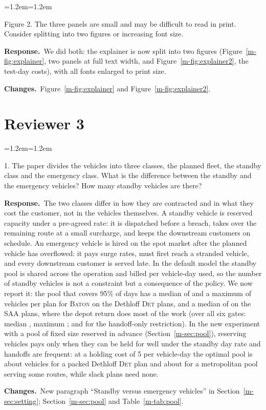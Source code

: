 \documentclass[11pt]{article}
\newenvironment{comment}{\par\medskip\noindent\color{rev}\itshape
  \begin{list}{}{\leftmargin=1.2em\rightmargin=1.2em}\item[]}%
  {\end{list}\par}
\newcommand{\resp}{\par\noindent\textbf{Response.}\ }
\newcommand{\chg}{\par\noindent\textbf{Changes.}\ }
\newcommand{\sref}[1]{Section~\ref{m-#1}}
\newcommand{\tref}[1]{Table~\ref{m-#1}}
\newcommand{\fref}[1]{Figure~\ref{m-#1}}
\newcommand{\BATON}{\textsc{Baton}}
\begin{document}
\begin{comment}
Figure 2. The three panels are small and may be difficult to read in
print. Consider splitting into two figures or increasing font size.
\end{comment}
\resp We did both: the explainer is now split into two figures
(\fref{fig:explainer}, two panels at full text width, and
\fref{fig:explainer2}, the test-day costs), with all fonts enlarged to
print size.
\chg \fref{fig:explainer} and \fref{fig:explainer2}.

\section*{Reviewer 3}

\begin{comment}
1. The paper divides the vehicles into three classes, the planned
fleet, the standby class and the emergency class. What is the
difference between the standby and the emergency vehicles? How many
standby vehicles are there?
\end{comment}
\resp The two classes differ in how they are contracted and in what
they cost the customer, not in the vehicles themselves. A standby
vehicle is reserved capacity under a pre-agreed rate: it is dispatched
before a breach, takes over the remaining route at a small surcharge,
and keeps the downstream customers on schedule. An emergency vehicle is
hired on the spot market after the planned vehicle has overflowed: it
pays surge rates, must first reach a stranded vehicle, and every
downstream customer is served late. In the default model the standby
pool is shared across the operation and billed per vehicle-day used, so
the number of standby vehicles is not a constraint but a consequence
of the policy. We now report it: the pool that covers 95\% of days has
a median of \poolDetMed{} and a maximum of \poolDetMax{} vehicles per
plan for \BATON{} on the Dethloff \textsc{Det} plans, and a median of
\poolSAAMed{} on the \textsc{SAA} plans, where the depot return does
most of the work (over all six gates: median \poolBatonMed, maximum
\poolBatonMax; \poolHoMed{} and \poolHoMax{} for the handoff-only
restriction). In
the new experiment with a pool of fixed size reserved in advance
(\sref{sec:pool}), reserving vehicles pays only when they can be held
for well under the standby day rate and handoffs are frequent: at a
holding cost of 5 per vehicle-day the optimal pool is about
\poolDethSstarLow{} vehicles for a packed Dethloff \textsc{Det} plan
and about \poolMetroSstarLow{} for a metropolitan pool serving some
\poolMetroK{} routes, while slack plans need none.
\chg New paragraph ``Standby versus emergency vehicles'' in
\sref{sec:setting}; \sref{sec:pool} and \tref{tab:pool}.
\end{document}
